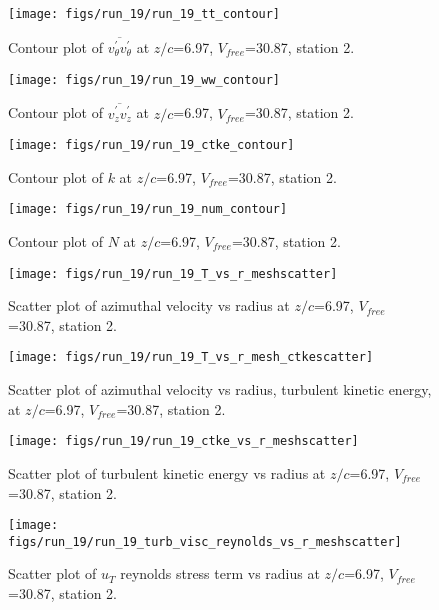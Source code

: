 \begin{figure}[H]
\centering
\texttt{[image: figs/run\_19/run\_19\_tt\_contour]}
\caption{Contour plot of $\overline{v_{\theta}^{\prime} v_{\theta}^{\prime}}$ at $z/c$=6.97, $V_{free}$=30.87, station 2.}
\end{figure}


\begin{figure}[H]
\centering
\texttt{[image: figs/run\_19/run\_19\_ww\_contour]}
\caption{Contour plot of $\overline{v_{z}^{\prime} v_{z}^{\prime}}$ at $z/c$=6.97, $V_{free}$=30.87, station 2.}
\end{figure}


\begin{figure}[H]
\centering
\texttt{[image: figs/run\_19/run\_19\_ctke\_contour]}
\caption{Contour plot of $k$ at $z/c$=6.97, $V_{free}$=30.87, station 2.}
\end{figure}


\begin{figure}[H]
\centering
\texttt{[image: figs/run\_19/run\_19\_num\_contour]}
\caption{Contour plot of $N$ at $z/c$=6.97, $V_{free}$=30.87, station 2.}
\end{figure}


\begin{figure}[H]
\centering
\texttt{[image: figs/run\_19/run\_19\_T\_vs\_r\_meshscatter]}
\caption{Scatter plot of azimuthal velocity vs radius at $z/c$=6.97, $V_{free}$=30.87, station 2.}
\end{figure}


\begin{figure}[H]
\centering
\texttt{[image: figs/run\_19/run\_19\_T\_vs\_r\_mesh\_ctkescatter]}
\caption{Scatter plot of azimuthal velocity vs radius, turbulent kinetic energy, at $z/c$=6.97, $V_{free}$=30.87, station 2.}
\end{figure}


\begin{figure}[H]
\centering
\texttt{[image: figs/run\_19/run\_19\_ctke\_vs\_r\_meshscatter]}
\caption{Scatter plot of turbulent kinetic energy vs radius at $z/c$=6.97, $V_{free}$=30.87, station 2.}
\end{figure}


\begin{figure}[H]
\centering
\texttt{[image: figs/run\_19/run\_19\_turb\_visc\_reynolds\_vs\_r\_meshscatter]}
\caption{Scatter plot of $
u_T$ reynolds stress term vs radius at $z/c$=6.97, $V_{free}$=30.87, station 2.}
\end{figure}



